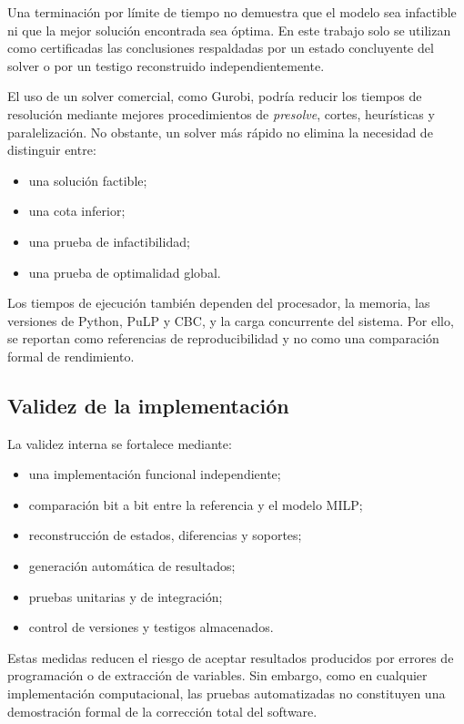 Una terminación por límite de tiempo no demuestra que el modelo sea
infactible ni que la mejor solución encontrada sea óptima. En este trabajo
solo se utilizan como certificadas las conclusiones respaldadas por un
estado concluyente del solver o por un testigo reconstruido
independientemente.

El uso de un solver comercial, como Gurobi, podría reducir los tiempos de
resolución mediante mejores procedimientos de \emph{presolve}, cortes,
heurísticas y paralelización. No obstante, un solver más rápido no elimina
la necesidad de distinguir entre:

\begin{itemize}
    \item una solución factible;
    \item una cota inferior;
    \item una prueba de infactibilidad;
    \item una prueba de optimalidad global.
\end{itemize}

Los tiempos de ejecución también dependen del procesador, la memoria, las
versiones de Python, PuLP y CBC, y la carga concurrente del sistema. Por
ello, se reportan como referencias de reproducibilidad y no como una
comparación formal de rendimiento.


\subsection{Validez de la implementación}
\label{subsec:validez_implementacion}

La validez interna se fortalece mediante:

\begin{itemize}
    \item una implementación funcional independiente;
    \item comparación bit a bit entre la referencia y el modelo MILP;
    \item reconstrucción de estados, diferencias y soportes;
    \item generación automática de resultados;
    \item pruebas unitarias y de integración;
    \item control de versiones y testigos almacenados.
\end{itemize}

Estas medidas reducen el riesgo de aceptar resultados producidos por
errores de programación o de extracción de variables. Sin embargo, como en
cualquier implementación computacional, las pruebas automatizadas no
constituyen una demostración formal de la corrección total del software.

